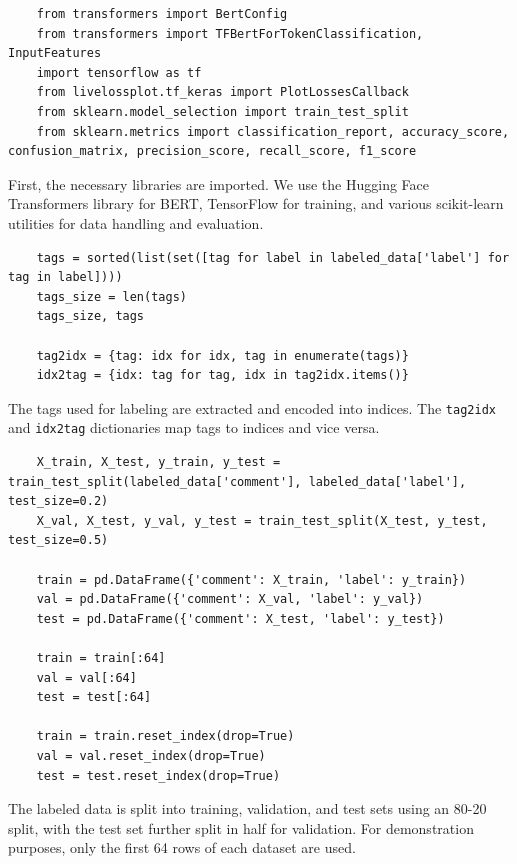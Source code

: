\documentclass{solutionclass} %
\begin{document}
\begin{solution}


\begin{lstlisting}
    from transformers import BertConfig
    from transformers import TFBertForTokenClassification, InputFeatures
    import tensorflow as tf
    from livelossplot.tf_keras import PlotLossesCallback
    from sklearn.model_selection import train_test_split
    from sklearn.metrics import classification_report, accuracy_score, confusion_matrix, precision_score, recall_score, f1_score
    \end{lstlisting}
    
    First, the necessary libraries are imported. We use the Hugging Face Transformers library for BERT, TensorFlow for training, and various scikit-learn utilities for data handling and evaluation.
    
    \begin{lstlisting}
    tags = sorted(list(set([tag for label in labeled_data['label'] for tag in label])))
    tags_size = len(tags)
    tags_size, tags
    
    tag2idx = {tag: idx for idx, tag in enumerate(tags)}
    idx2tag = {idx: tag for tag, idx in tag2idx.items()}
    \end{lstlisting}
    
    The tags used for labeling are extracted and encoded into indices. The \texttt{tag2idx} and \texttt{idx2tag} dictionaries map tags to indices and vice versa.
    
    \begin{lstlisting}
    X_train, X_test, y_train, y_test = train_test_split(labeled_data['comment'], labeled_data['label'], test_size=0.2)
    X_val, X_test, y_val, y_test = train_test_split(X_test, y_test, test_size=0.5)
    
    train = pd.DataFrame({'comment': X_train, 'label': y_train})
    val = pd.DataFrame({'comment': X_val, 'label': y_val})
    test = pd.DataFrame({'comment': X_test, 'label': y_test})
    
    train = train[:64]
    val = val[:64]
    test = test[:64]
    
    train = train.reset_index(drop=True)
    val = val.reset_index(drop=True)
    test = test.reset_index(drop=True)
    \end{lstlisting}
    
    The labeled data is split into training, validation, and test sets using an 80-20 split, with the test set further split in half for validation. For demonstration purposes, only the first 64 rows of each dataset are used.
    

\end{solution}
\end{document}
